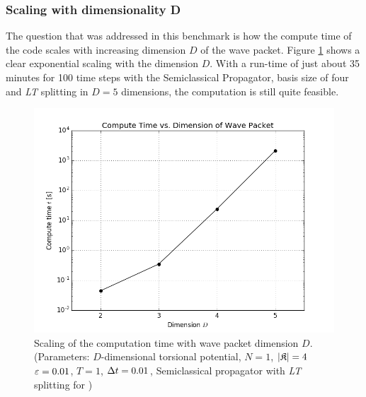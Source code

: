 \subsubsection{Scaling with dimensionality D}
%
The question that was addressed in this benchmark is how the compute time of the code scales with increasing dimension $D$ of the wave packet.
Figure \ref{fig:dimension_analysis} shows a clear exponential scaling with the dimension $D$.
With a run-time of just about 35 minutes for 100 time steps with the Semiclassical Propagator, basis size of four and \emph{LT} splitting in $D=5$ dimensions, the computation is still quite feasible.
%
\begin{figure}[ht]
	\centering
	\includegraphics[width=.8\textwidth]{figures/dim.png}
	\caption{Scaling of the computation time with wave packet dimension $D$.
	(Parameters: $D$-dimensional torsional potential, $N=1$, $|\mathfrak{K}|=4$ $\varepsilon=0.01$, $T=1$, $\Delta t=0.01$, Semiclassical propagator with \emph{LT} splitting for )}
	\label{fig:dimension_analysis}
\end{figure}
